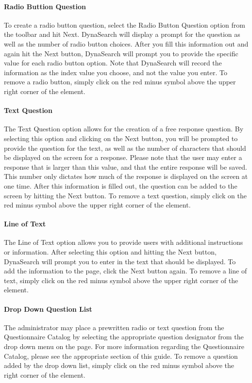 \documentclass[article]{ij4uq}              %
\begin{document}
\paragraph{Radio Buttion Question}
To create a radio button question, select the Radio Button Question option from the toolbar and hit Next. DynaSearch will display a prompt for the question as well as the number of radio button choices. After you fill this information out and again hit the Next button, DynaSearch will prompt you to provide the specific value for each radio button option. 
Note that DynaSearch will record the information as the index value you choose, and not the value you enter. To remove a radio button, simply click on the red minus symbol above the upper right corner of the element.

\paragraph{Text Question}
The Text Question option allows for the creation of a free response question. By selecting this option and clicking on the Next button, you will be prompted to provide the question for the text, as well as the number of characters that should be displayed on the screen for a response. Please note that the user may enter a response that is larger than this value, and that the entire response will be saved. This number only dictates how much of the response is displayed on the screen at one time. 
After this information is filled out, the question can be added to the screen by hitting the Next button. To remove a text question, simply click on the red minus symbol above the upper right corner of the element.

\paragraph{Line of Text}
The Line of Text option allows you to provide users with additional instructions or information. After selecting this option and hitting the Next button, DynaSearch will prompt you to enter in the text that should be displayed. To add the information to the page, click the Next button again. To remove a line of text, simply click on the red minus symbol above the upper right corner of the element. 

\paragraph{Drop Down Question List}
The administrator may place a prewritten radio or text question from the Questionnaire Catalog by selecting the appropriate question designator from the drop down menu on the page. For more information regarding the Questionnaire Catalog, please see the appropriate section of this guide. To remove a question added by the drop down list, simply click on the red minus symbol above the right corner of the element. 
\end{document}
